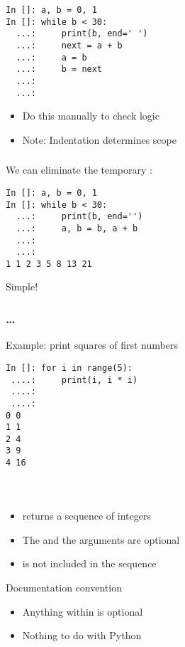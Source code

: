 \documentclass[14pt,compress]{beamer}
\begin{document}
\begin{frame}[fragile]
  \frametitle{}
  \begin{lstlisting}
In []: a, b = 0, 1
In []: while b < 30:
  ...:     print(b, end=' ')
  ...:     next = a + b
  ...:     a = b
  ...:     b = next
  ...:
  ...:
\end{lstlisting}
  \begin{itemize}
  \item Do this manually to check logic
  \item Note: Indentation determines scope
  \end{itemize}
\end{frame}

\begin{frame}[fragile]
  \frametitle{}
  We can eliminate the temporary :
  \begin{lstlisting}
In []: a, b = 0, 1
In []: while b < 30:
  ...:     print(b, end='')
  ...:     a, b = b, a + b
  ...:
  ...:
1 1 2 3 5 8 13 21
\end{lstlisting}
  Simple!
\end{frame}


\begin{frame}[fragile]
  \frametitle{ \ldots {}}
Example: print squares of first  numbers
  \begin{lstlisting}
In []: for i in range(5):
 ....:     print(i, i * i)
 ....:
 ....:
0 0
1 1
2 4
3 9
4 16
\end{lstlisting}
\end{frame}

\begin{frame}[fragile]
\frametitle{}
\\
\begin{itemize}
  \item {} returns a sequence of integers
  \item The  and the  arguments are optional
  \item {} is not included in the sequence
\end{itemize}
\vspace*{.5in}
\begin{block}{Documentation convention}
  \begin{itemize}
    \item \alert{Anything within \typ{[]} is optional}
    \item Nothing to do with Python
  \end{itemize}
\end{block}
\end{frame}
\end{document}
